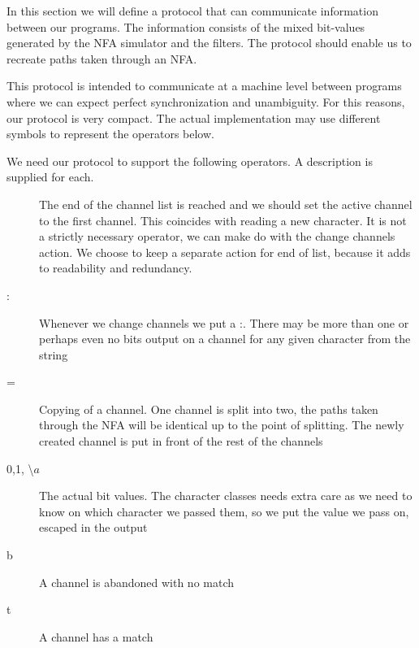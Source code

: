 
In this section we will define a protocol that can communicate
information between our programs. The information consists of the
mixed bit-values generated by the NFA simulator and the filters. The
protocol should enable us to recreate paths taken through an NFA. 

This protocol is intended to communicate at a machine level between programs where we can expect perfect synchronization and unambiguity. For this reasons, our protocol is very compact. The actual implementation may use different symbols to represent the operators below.

We need our protocol to support the following operators. A description is supplied for each.

\begin{description}
  \item[\textbar] The end of the channel list is reached and we should
    set the active channel to the first channel. This coincides with
    reading a new character. It is not a strictly necessary operator,
    we can make do with the change channels action. We choose to keep
    a separate action for end of list, because it adds to readability
    and redundancy.
  \item[:] Whenever we change channels we put a :. There may be more
    than one or perhaps even no bits output on a channel for any given
    character from the string
  \item[=] Copying of a channel. One channel is split into two, the
    paths taken through the NFA will be identical up to the point of
    splitting. The newly created channel is put in front of the rest
    of the channels
  \item[0,1, \textbackslash $a$] The actual bit values. The character
    classes needs extra care as we need to know on which character we
    passed them, so we put the value we pass on, escaped in the output
  \item[b] A channel is abandoned with no match
  \item[t] A channel has a match
\end{description}

